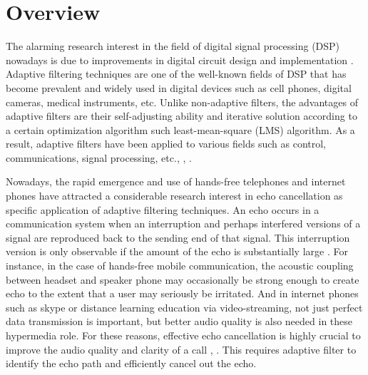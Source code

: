 
\section{Overview} \label{sec:1.1}
\vspace{-0.5cm}
\noindent The alarming research interest in the field of digital signal processing (DSP) nowadays is due to improvements in digital circuit design and implementation \cite{deniz}. Adaptive filtering techniques are one of the well-known fields of DSP that has become prevalent and widely used in digital devices such as cell phones, digital cameras, medical instruments, etc. Unlike non-adaptive filters, the advantages of adaptive filters are their self-adjusting ability and iterative solution according to a certain optimization algorithm such least-mean-square (LMS) algorithm. As a result, adaptive filters have been applied to various fields such as control, communications, signal processing, etc., \cite{Haykins}, \cite{Hayes}.

\vspace{-0.5cm}
\par
\noindent Nowadays, the rapid emergence and use of hands-free telephones and internet phones have attracted a considerable research interest in echo cancellation as specific application of adaptive filtering techniques. An echo occurs in a communication system when an interruption and perhaps interfered versions of a signal are reproduced back to the sending end of that signal. This interruption version is only observable if the amount of the echo is substantially large \cite{son}. For instance, in the case of hands-free mobile communication, the acoustic coupling between headset and speaker phone may occasionally be strong enough to create echo to the extent that a user may seriously be irritated. And in internet phones such as skype or distance learning education via video-streaming, not just perfect data transmission is important, but better audio quality is also needed in these hypermedia role. For these reasons, effective echo cancellation is highly crucial to improve the audio quality and clarity of a call \cite{Gay}, \cite{Gilloire}. This requires adaptive filter to identify the echo path and efficiently cancel out the echo.

